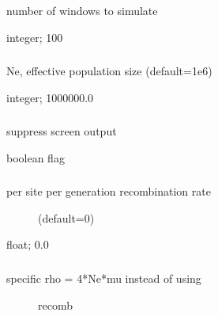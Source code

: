 \documentclass[letterpaper,12pt,english]{sphinxmanual}
\begin{document}
\subsubsection{}
\label{\detokenize{prog_desc:nloci}}
 number of windows to simulate

 integer;  100


\subsubsection{}
\label{\detokenize{prog_desc:popsize}}
 Ne, effective population size (default=1e6)

 integer;  1000000.0


\subsubsection{}
\label{\detokenize{prog_desc:quiet}}
 suppress screen output

 boolean flag


\subsubsection{}
\label{\detokenize{prog_desc:recomb}}\begin{description}
\item[{ per site per generation recombination rate}] \leavevmode
(default=0)

\end{description}

 float;  0.0


\subsubsection{}
\label{\detokenize{prog_desc:rho}}\begin{description}
\item[{ specific rho = 4*Ne*mu instead of using}] \leavevmode
\textendash{}recomb

\end{description}
\end{document}
